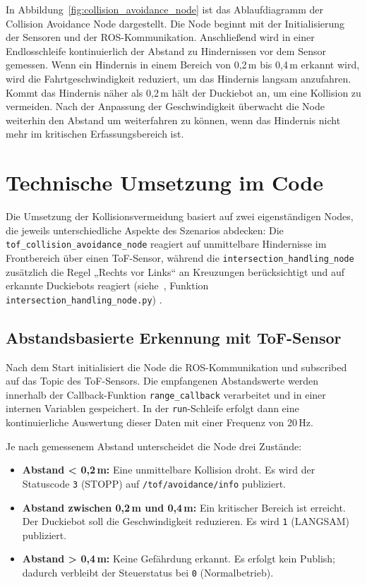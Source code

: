 In Abbildung~\ref{fig:collision_avoidance_node} ist das Ablaufdiagramm der Collision Avoidance Node dargestellt. Die Node beginnt mit der Initialisierung der Sensoren und der ROS-Kommunikation. Anschließend wird in einer Endlosschleife kontinuierlich der Abstand zu Hindernissen vor dem Sensor gemessen. Wenn ein Hindernis in einem Bereich von 0,2\,m bis 0,4\,m erkannt wird, wird die Fahrtgeschwindigkeit reduziert, um das Hindernis langsam anzufahren. Kommt das Hindernis näher als 0,2\,m hält der Duckiebot an, um eine Kollision zu vermeiden. Nach der Anpassung der Geschwindigkeit überwacht die Node weiterhin den Abstand um weiterfahren zu können, wenn das Hindernis nicht mehr im kritischen Erfassungsbereich ist.

\section{Technische Umsetzung im Code}

Die Umsetzung der Kollisionsvermeidung basiert auf zwei eigenständigen Nodes, die jeweils unterschiedliche Aspekte des Szenarios abdecken: Die \texttt{tof\_collision\_avoidance\_node} reagiert auf unmittelbare Hindernisse im Frontbereich über einen \ac{ToF}-Sensor, während die \texttt{intersection\_handling\_node} zusätzlich die Regel „Rechts vor Links“ an Kreuzungen berücksichtigt und auf erkannte Duckiebots reagiert (siehe~\cite{QuackSquad}, Funktion \texttt{intersection\_handling\_node.py})
.

\subsection{Abstandsbasierte Erkennung mit ToF-Sensor}
Nach dem Start initialisiert die Node die ROS-Kommunikation und subscribed auf das Topic des \ac{ToF}-Sensors. Die empfangenen Abstands­werte werden innerhalb der Callback-Funktion \texttt{range\_callback} verarbeitet und in einer internen Variablen gespeichert. In der \texttt{run}-Schleife erfolgt dann eine kontinuierliche Auswertung dieser Daten mit einer Frequenz von 20\,Hz.

Je nach gemessenem Abstand unterscheidet die Node drei Zustände:
\begin{itemize}
    \item \textbf{Abstand < 0{,}2\,m:} Eine unmittelbare Kollision droht. Es wird der Statuscode \texttt{3} (STOPP) auf \texttt{/tof/avoidance/info} publiziert.
    \item \textbf{Abstand zwischen 0{,}2\,m und 0{,}4\,m:} Ein kritischer Bereich ist erreicht. Der Duckiebot soll die Geschwindigkeit reduzieren. Es wird \texttt{1} (LANGSAM) publiziert.
    \item \textbf{Abstand > 0{,}4\,m:} Keine Gefährdung erkannt. Es erfolgt kein Publish; dadurch verbleibt der Steuerstatus bei \texttt{0} (Normalbetrieb).
\end{itemize}

